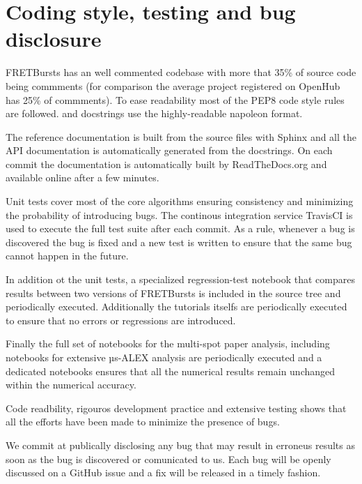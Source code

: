 \section{Coding style, testing and bug disclosure}

FRETBursts has an well commented codebase with more that 35\% of source code
being commments (for comparison the average project registered on OpenHub has 25\%
of commments). To ease readability most of the PEP8 code style rules are followed.
and docstrings use the highly-readable napoleon format.

The reference documentation is built from the source files with Sphinx and
all the API documentation is automatically generated from the docstrings.
On each commit the documentation is automatically built by ReadTheDocs.org
and available online after a few minutes.

Unit tests cover most of the core algorithms ensuring consistency and 
minimizing the probability of introducing bugs. The continous integration
service TravisCI is used to execute the full test suite after each commit.
As a rule, whenever a bug is discovered the bug is fixed and a new test is 
written to ensure that the same bug cannot happen in the future.

In addition ot the unit tests, a specialized regression-test notebook
that compares results between two versions of FRETBursts is
included in the source tree and periodically executed. Additionally
the tutorials itselfs are periodically executed to ensure that
no errors or regressions are introduced.

Finally the full set of notebooks for the multi-spot paper analysis,
including notebooks for extensive µs-ALEX analysis are periodically
executed and a dedicated notebooks ensures that all the numerical
results remain unchanged within the numerical accuracy.

Code readbility, rigouros development practice and extensive testing
shows that all the efforts have been made to minimize the presence 
of bugs.

We commit at publically disclosing any bug that may result in erroneus results 
as soon as the bug is discovered or comunicated to us.
Each bug will be openly discussed on a GitHub issue and a fix will be released 
in a timely fashion.
